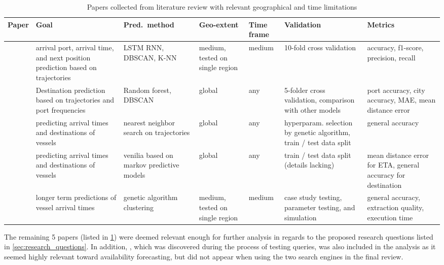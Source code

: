 \begin{table}[htbp]
    \centering
    \begin{tabular}{p{0.6in} p{0.8in} p{0.75in} p{0.6in} p{0.5in} p{0.8in} p{0.8in}}
    \hline
    \bfseries{Paper} & \bfseries{Goal} & \bfseries{Pred.\ method} & \bfseries{Geo-extent} & \bfseries{Time frame} & \bfseries{Validation} & \bfseries{Metrics} \\ \hline
        \cite{Karatas2020TrajectoryData} & arrival port, arrival time, and next position prediction based on trajectories & LSTM RNN, DBSCAN, K-NN & medium, tested on single region & medium & 10-fold cross validation & accuracy, f1-score, precision, recall \\ \hline
        \cite{Zhang2020AISApproach} & Destination prediction based on trajectories and port frequencies & Random forest, DBSCAN & global & any & 5-folder cross validation, comparison with other models & port accuracy, city accuracy, MAE, mean distance error \\ \hline
        \cite{Rosca2018GrandRoutes} & predicting arrival times and destinations of vessels & nearest neighbor search on trajectories & global & any & hyperparam. selection by genetic algorithm, train / test data split & general accuracy \\ \hline
        \cite{Bachar2018GrandDestination} & predicting arrival times and destinations of vessels & venilia based on markov predictive models & global & any & train / test data split (details lacking) & mean distance error for ETA, general accuracy for destination \\ \hline
        \cite{Dobrkovic2018MaritimeData} & longer term predictions of vessel arrival times & genetic algorithm clustering & medium, tested on single region & medium & case study testing, parameter testing, and simulation & general accuracy, extraction quality, execution time \\ \hline
    \end{tabular}
\caption{Papers collected from literature review with relevant geographical and time limitations}\label{tab:most_relevant_papers}
\end{table}

The remaining \textbf{}5 papers (listed in \cref{tab:most_relevant_papers}) were deemed relevant enough for further analysis in regards to the proposed research questions listed in \cref{sec:research_questions}. In addition, \cite{lechtenberg2019}, which was discovered during the process of testing queries, was also included in the analysis as it seemed highly relevant toward availability forecasting, but did not appear when using the two search engines in the final review.


